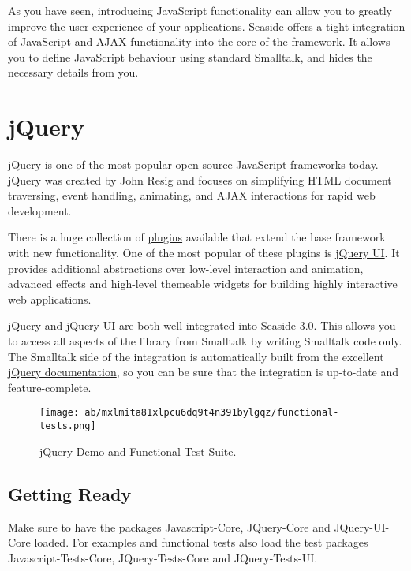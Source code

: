 \documentclass[a4paper,10pt,twoside]{book}
\begin{document}
As you have seen, introducing JavaScript functionality can allow you to greatly improve the user experience of your applications. Seaside offers a tight integration of JavaScript and AJAX functionality into the core of the framework. It allows you to define JavaScript behaviour using standard Smalltalk, and hides the necessary details from you.

\chapter{jQuery}
\label{book:web20:jquery}

\href{http://jquery.com}{jQuery} is one of the most popular open-source JavaScript frameworks today. jQuery was created by John Resig and focuses on simplifying HTML document traversing, event handling, animating, and AJAX interactions for rapid web development.

There is a huge collection of \href{http://plugins.jquery.com/}{plugins} available that extend the base framework with new functionality. One of the most popular of these plugins is \href{http://jqueryui.com/}{jQuery UI}. It provides additional abstractions over low-level interaction and animation, advanced effects and high-level themeable widgets for building highly interactive web applications.

jQuery and jQuery UI are both well integrated into Seaside 3.0. This allows you to access all aspects of the library from Smalltalk by writing Smalltalk code only. The Smalltalk side of the integration is automatically built from the excellent \href{http://docs.jquery.com}{jQuery documentation}, so you can be sure that the integration is up-to-date and feature-complete. 

\begin{figure}[h!tbp]
	\begin{center}
		\texttt{[image: ab/mxlmita81xlpcu6dq9t4n391bylgqz/functional-tests.png]}
		\caption{jQuery Demo and Functional Test Suite.\label{book:web20:jquery:functionaltests}}
	\end{center}
\end{figure}


\section{Getting Ready}
\label{book:web20:jquery:gettingready}

Make sure to have the packages Javascript-Core, JQuery-Core and JQuery-UI-Core loaded. For examples and functional tests also load the test packages Javascript-Tests-Core, JQuery-Tests-Core and JQuery-Tests-UI.
\end{document}
